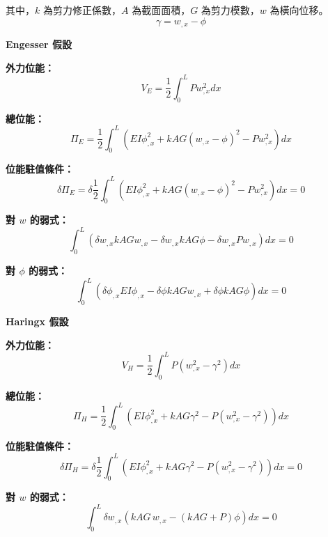 ﻿\documentclass[UTF8, a4paper, 12pt]{ctexart}
\begin{document}
其中，$k$ 為剪力修正係數，$A$ 為截面面積，$G$ 為剪力模數，$w$ 為橫向位移。
\begin{equation}
  \gamma = w_{,x}-\phi
\end{equation}

\medskip
\noindent\textbf{Engesser 假設}

\textbf{外力位能：}
\begin{equation}
  V_E = \frac{1}{2}\int_{0}^{L}P w_{,x}^{2}dx
\end{equation}

\textbf{總位能：}
\begin{equation}
  \Pi_E = \frac{1}{2}\int_{0}^{L}\left(EI\phi_{,x}^{2}+kAG(w_{,x}-\phi)^{2}-Pw_{,x}^{2}\right)dx
\end{equation}

\textbf{位能駐值條件：}
\begin{equation}
  \delta\Pi_E = \delta\frac{1}{2}\int_{0}^{L}\left(EI\phi_{,x}^{2}+kAG(w_{,x}-\phi)^{2}-Pw_{,x}^{2}\right)dx = 0
\end{equation}

\textbf{對 $w$ 的弱式：}
\begin{equation}
  \int_{0}^{L}\left(\delta w_{,x}kAGw_{,x} - \delta w_{,x}kAG\phi - \delta w_{,x}Pw_{,x}\right)dx = 0
\end{equation}

\textbf{對 $\phi$ 的弱式：}
\begin{equation}
  \int_{0}^{L}\left(\delta\phi_{,x}EI\phi_{,x} - \delta\phi kAGw_{,x} + \delta\phi kAG\phi\right)dx = 0
\end{equation}

\medskip
\noindent\textbf{Haringx 假設}

\textbf{外力位能：}
\begin{equation}
  V_H = \frac{1}{2}\int_{0}^{L}P\left(w_{,x}^{2}-\gamma^{2}\right)dx
\end{equation}

\textbf{總位能：}
\begin{equation}
  \Pi_H = \frac{1}{2}\int_{0}^{L}\left(EI\phi_{,x}^{2}+kAG\gamma^{2}-P\left(w_{,x}^{2}-\gamma^{2}\right)\right)dx
\end{equation}

\textbf{位能駐值條件：}
\begin{equation}
  \delta\Pi_H = \delta\frac{1}{2}\int_{0}^{L}\left(EI\phi_{,x}^{2}+kAG\gamma^{2}-P\left(w_{,x}^{2}-\gamma^{2}\right)\right)dx = 0
\end{equation}

\textbf{對 $w$ 的弱式：}
\begin{equation}
  \int_{0}^{L}\delta w_{,x}\left(kAG\,w_{,x}-(kAG+P)\phi\right)dx = 0
\end{equation}
\end{document}
